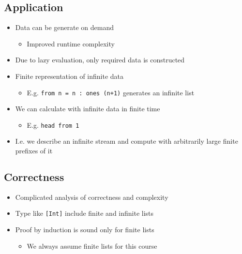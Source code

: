 \subsection{Application}
\begin{itemize}
        \begin{itemize}
            \item Data can be generate on demand
                \begin{itemize}
                    \item Improved runtime complexity
                \end{itemize}
            \item Due to lazy evaluation, only required data is constructed
        \end{itemize}
        \begin{itemize}
            \item Finite representation of infinite data
                \begin{itemize}
                    \item E.g. \verb|from n = n : ones (n+1)| generates an infinite list
                \end{itemize}
            \item We can calculate with infinite data in finite time
                \begin{itemize}
                    \item E.g. \verb+head from 1+
                \end{itemize}
            \item I.e. we describe an infinite stream and compute with arbitrarily large finite prefixes of it
        \end{itemize}
\end{itemize}

\subsection{Correctness}
\begin{itemize}
    \item Complicated analysis of correctness and complexity
    \item Type like \verb+[Int]+ include finite and infinite lists
    \item Proof by induction is sound only for finite lists
        \begin{itemize}
            \item We always assume finite lists for this course
        \end{itemize}
\end{itemize}
